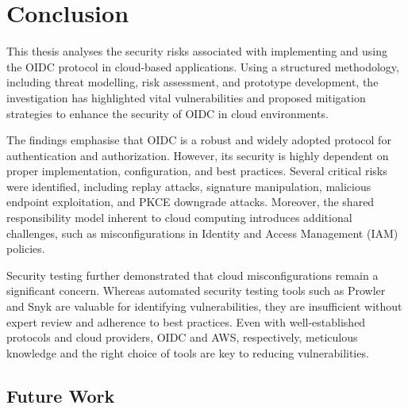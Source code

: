 \chapter{Conclusion}

This thesis analyses the security risks associated with implementing and using the OIDC protocol in cloud-based applications. Using a structured methodology, including threat modelling, risk assessment, and prototype development, the investigation has highlighted vital vulnerabilities and proposed mitigation strategies to enhance the security of OIDC in cloud environments.

The findings emphasise that OIDC is a robust and widely adopted protocol for authentication and authorization. However, its security is highly dependent on proper implementation, configuration, and best practices. Several critical risks were identified, including replay attacks, signature manipulation, malicious endpoint exploitation, and PKCE downgrade attacks. Moreover, the shared responsibility model inherent to cloud computing introduces additional challenges, such as misconfigurations in Identity and Access Management (IAM) policies.

Security testing further demonstrated that cloud misconfigurations remain a significant concern. Whereas automated security testing tools such as Prowler and Snyk are valuable for identifying vulnerabilities, they are insufficient without expert review and adherence to best practices. Even with well-established protocols and cloud providers, OIDC and AWS, respectively, meticulous knowledge and the right choice of tools are key to reducing vulnerabilities.   


\section{Future Work}

